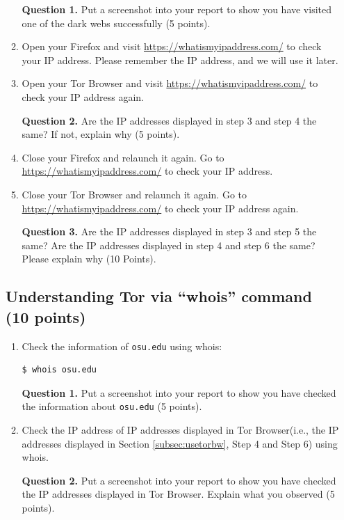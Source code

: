 \documentclass[11pt]{article}
\newcommand{\tor}{{\sf Tor}\xspace}
\newcommand{\torbw}{{\sf Tor Browser}\xspace}
\begin{document}
\begin{enumerate}
\begin{enumerate}
\textbf{Question 1.} Put a screenshot into your report to show you have visited one of the dark webs successfully (5 points). 
 

\item Open your \textsf{Firefox} and visit \url{https://whatismyipaddress.com/} to check your IP address. Please remember the IP address, and we will use it later.   

 
\item Open your \torbw and visit \url{https://whatismyipaddress.com/} to check your IP address again.  

\textbf{Question 2.} Are the IP addresses displayed in step 3 and step 4 the same? If not, explain why (5 points). 

\item  Close your \textsf{Firefox}  and relaunch it again. Go to \url{https://whatismyipaddress.com/} to check your IP address.  

\item Close your \torbw and relaunch it again. Go to \url{https://whatismyipaddress.com/} to check your IP address again. 

\textbf{Question 3.} Are the IP addresses displayed in step 3 and step 5 the same? Are the IP addresses displayed in step 4 and step 6 the same? Please explain why (10 Points). 

 
\end{enumerate}

\subsection{Understanding \tor via ``whois'' command (10 points)} 
\begin{enumerate}

\item Check the information of \texttt{osu.edu} using \textsf{whois}:
 \begin{lstlisting}
$ whois osu.edu
\end{lstlisting}\vspace{-6mm}

\textbf{Question 1.} Put a screenshot into your report to show you have checked the information about \texttt{osu.edu} (5 points). 
 
\item Check the IP address of IP addresses displayed in \torbw (i.e., the IP addresses displayed in Section \ref{subsec:usetorbw}, Step 4 and Step 6) using \textsf{whois}.

\textbf{Question 2.} Put a screenshot into your report to show you have checked the IP addresses displayed in \torbw. Explain what you observed (5 points). 


\end{enumerate}
\end{enumerate}
\end{document}
